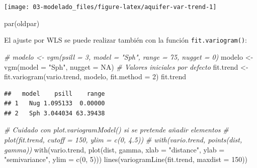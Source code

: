 \documentclass[
  spanish,
]{book}
\newenvironment{Shaded}{\begin{snugshade}}{\end{snugshade}}
\newcommand{\AttributeTok}[1]{\textcolor[rgb]{0.77,0.63,0.00}{#1}}
\newcommand{\CommentTok}[1]{\textcolor[rgb]{0.56,0.35,0.01}{\textit{#1}}}
\newcommand{\ConstantTok}[1]{\textcolor[rgb]{0.00,0.00,0.00}{#1}}
\newcommand{\DecValTok}[1]{\textcolor[rgb]{0.00,0.00,0.81}{#1}}
\newcommand{\FunctionTok}[1]{\textcolor[rgb]{0.00,0.00,0.00}{#1}}
\newcommand{\NormalTok}[1]{#1}
\newcommand{\OtherTok}[1]{\textcolor[rgb]{0.56,0.35,0.01}{#1}}
\newcommand{\StringTok}[1]{\textcolor[rgb]{0.31,0.60,0.02}{#1}}
\theoremstyle{break}
\theoremstyle{definition}
\theoremstyle{definition}
\theoremstyle{definition}
\theoremstyle{definition}
\theoremstyle{remark}
\begin{document}
\begin{center}\texttt{[image: 03-modelado\_files/figure-latex/aquifer-var-trend-1]} \end{center}

\begin{Shaded}
\begin{Highlighting}[]
\FunctionTok{par}\NormalTok{(oldpar)}
\end{Highlighting}
\end{Shaded}

El ajuste por WLS se puede realizar también con la función \texttt{fit.variogram()}:

\begin{Shaded}
\begin{Highlighting}[]
\CommentTok{\# modelo \textless{}{-} vgm(psill = 3, model = "Sph", range = 75, nugget = 0) }
\NormalTok{modelo }\OtherTok{\textless{}{-}} \FunctionTok{vgm}\NormalTok{(}\AttributeTok{model =} \StringTok{"Sph"}\NormalTok{, }\AttributeTok{nugget =} \ConstantTok{NA}\NormalTok{) }\CommentTok{\# Valores iniciales por defecto}
\NormalTok{fit.trend }\OtherTok{\textless{}{-}} \FunctionTok{fit.variogram}\NormalTok{(vario.trend, modelo, }\AttributeTok{fit.method =} \DecValTok{2}\NormalTok{)}
\NormalTok{fit.trend}
\end{Highlighting}
\end{Shaded}

\begin{verbatim}
##   model    psill    range
## 1   Nug 1.095133  0.00000
## 2   Sph 3.044034 63.39438
\end{verbatim}

\begin{Shaded}
\begin{Highlighting}[]
\CommentTok{\# Cuidado con plot.variogramModel() si se pretende añadir elementos}
\CommentTok{\# plot(fit.trend, cutoff = 150, ylim = c(0, 4.5))}
\CommentTok{\# with(vario.trend,  points(dist, gamma))}
\FunctionTok{with}\NormalTok{(vario.trend, }\FunctionTok{plot}\NormalTok{(dist, gamma, }\AttributeTok{xlab =} \StringTok{"distance"}\NormalTok{, }
                       \AttributeTok{ylab =}  \StringTok{"semivariance"}\NormalTok{, }\AttributeTok{ylim =} \FunctionTok{c}\NormalTok{(}\DecValTok{0}\NormalTok{, }\DecValTok{5}\NormalTok{)))}
\FunctionTok{lines}\NormalTok{(}\FunctionTok{variogramLine}\NormalTok{(fit.trend, }\AttributeTok{maxdist =} \DecValTok{150}\NormalTok{))}
\end{Highlighting}
\end{Shaded}
\end{document}
